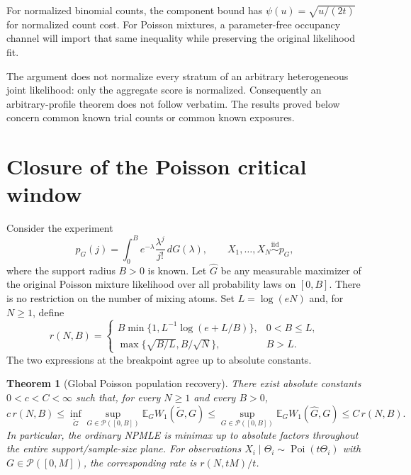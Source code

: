 \documentclass[11pt,a4paper]{article}
\newtheorem{theorem}{Theorem}[section]
\theoremstyle{definition}
\theoremstyle{remark}
\numberwithin{equation}{section}
\begin{document}
For normalized binomial counts, the component bound has $\psi(u)=\sqrt{u/(2t)}$ for normalized count cost.
For Poisson mixtures, a parameter-free occupancy channel will import
that same inequality while preserving the original likelihood fit.

The argument does not normalize every stratum of an arbitrary
heterogeneous joint likelihood: only the aggregate score is normalized.
Consequently an arbitrary-profile theorem does not follow verbatim.
The results proved below concern common known trial counts or common
known exposures.



\clearpage

\section{Closure of the Poisson critical window}
\label{E:pc:sec}

Consider the experiment
\[
 p_G(j)=\int_0^B e^{-\lambda}\frac{\lambda^j}{j!}\,dG(\lambda),
 \qquad X_1,\ldots,X_N\overset{\mathrm{iid}}\sim p_G,
\]
where the support radius $B>0$ is known.  Let $\widehat G$ be any
measurable maximizer of the original Poisson mixture likelihood over
all probability laws on $[0,B]$.  There is no restriction on the
number of mixing atoms.  Set $L=\log(eN)$ and, for $N\ge1$, define
\begin{equation}\label{E:pc:rate}
 r(N,B)=
 \begin{cases}
 B\min\{1,L^{-1}\log(e+L/B)\},&0<B\le L,\\[2mm]
 \max\{\sqrt{B/L},B/\sqrt N\},&B>L.
 \end{cases}
\end{equation}
The two expressions at the breakpoint agree up to absolute constants.

\begin{theorem}[Global Poisson population recovery]\label{E:pc:main}
There exist absolute constants $0<c<C<\infty$ such that, for every
$N\ge1$ and every $B>0$,
\[
 c\,r(N,B)\le
 \inf_{\widetilde G}\sup_{G\in\mathcal P([0,B])}
       \mathbb E_G W_1(\widetilde G,G)
 \le \sup_{G\in\mathcal P([0,B])}
       \mathbb E_G W_1(\widehat G,G)
 \le C\,r(N,B).
\]
In particular, the ordinary NPMLE is minimax up to absolute factors
throughout the entire support/sample-size plane.  For observations
$X_i\mid\Theta_i\sim\operatorname{Poi}(t\Theta_i)$ with
$G\in\mathcal P([0,M])$, the corresponding rate is $r(N,tM)/t$.
\end{theorem}
\end{document}
